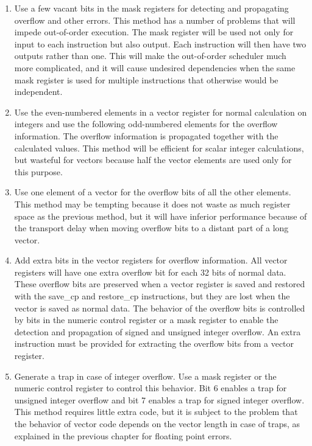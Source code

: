 \documentclass[forwardcom.tex]{subfiles}
\begin{document}
\begin{enumerate}
\item Use a few vacant bits in the mask registers for detecting and propagating overflow and other errors. This method has a number of problems that will impede out-of-order execution. The mask register will be used not only for input to each instruction but also output. Each instruction will then have two outputs rather than one. This will make the out-of-order scheduler much more complicated, and it will cause undesired dependencies when the same mask register is used for multiple instructions that otherwise would be independent.

\item Use the even-numbered elements in a vector register for normal calculation on integers 
and use the following odd-numbered elements for the overflow information. The overflow
information is propagated together with the calculated values. 
This method will be efficient for scalar integer calculations, but wasteful for vectors because half the vector elements are used only for this purpose. 

\item Use one element of a vector for the overflow bits of all the other elements. This method may be tempting because it does not waste as much register space as the previous method, but it will have inferior performance because of the transport delay when moving overflow bits to a distant part of a long vector.

\item Add extra bits in the vector registers for overflow information. All vector registers will have one extra overflow bit for each 32 bits of normal data. These overflow bits are preserved when a vector register is saved and restored with the save\_cp and restore\_cp instructions, but they are lost when the vector is saved as normal data. The behavior of the overflow bits is controlled by bits in the numeric control register or a mask register to enable the detection and propagation of signed and unsigned integer overflow.
An extra instruction must be provided for extracting the overflow bits from a vector register.

\item Generate a trap in case of integer overflow. Use a mask register or the numeric control register to control this behavior. Bit 6 enables a trap for unsigned integer overflow and bit 7 enables a trap for signed integer overflow. This method requires little extra code, but it is subject to the problem that the behavior of vector code depends on the vector length in case of traps, as explained in the previous chapter for floating point errors.
\end{enumerate}
\end{document}
